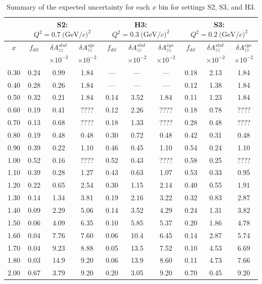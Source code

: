 \begin{table}
\begin{center}
\begin{tabular}{c|ccc|ccc|ccc}
 ~ & \multicolumn{3}{|c}{S2: $Q^2=0.7\mathrm{~(GeV/}c)^2$} & \multicolumn{3}{|c}{H3: $Q^2=0.3\mathrm{~(GeV/}c)^2$} & \multicolumn{3}{|c}{S3: $Q^2=0.2\mathrm{~(GeV/}c)^2$} \\
 \hline
  $x$  & $f_{dil}$ & $\delta A_{zz}^{stat}$ & $\delta A_{zz}^{sys}$ & $f_{dil}$ & $\delta A_{zz}^{stat}$ & $\delta A_{zz}^{sys}$ & $f_{dil}$ & $\delta A_{zz}^{stat}$ & $\delta A_{zz}^{sys}$ \\
  &     & $\times 10^{-2}$  & $\times 10^{-2}$  &    & $\times 10^{-2}$  & $\times 10^{-2}$ &    & $\times 10^{-2}$  & $\times 10^{-2}$ \\
\hline\hline
 0.30   &  0.24	 & 0.99	& 1.84	& ---	& ---	& ---	& 0.18	& 2.13	& 1.84 \\
 0.40   &  0.28	 & 0.26	& 1.84	& ---	& ---	& ---	& 0.12	& 1.38	& 1.84 \\
 0.50   &  0.32	 & 0.21	& 1.84	& 0.14	& 3.52	& 1.84	& 0.11	& 1.23	& 1.84 \\
 0.60   &  0.19	 & 0.41	& ????	& 0.12	& 2.26	& ????	& 0.18	& 0.78	& ???? \\ 
 0.70   &  0.13	 & 0.68	& ????	& 0.18	& 1.33	& ????	& 0.28	& 0.48	& ???? \\
 0.80	&  0.19	 & 0.48	& 0.48	& 0.30	& 0.72	& 0.48	& 0.42	& 0.31	& 0.48 \\
 0.90	&  0.39	 & 0.22 	& 1.10 	& 0.46	& 0.45	& 1.10	& 0.54	& 0.24	& 1.10 \\
 1.00	&  0.52	 & 0.16	& ???? 	& 0.52	& 0.43	& ????	& 0.58	& 0.25	& ???? \\
 1.10	&  0.39	 & 0.28	& 1.27 	& 0.43	& 0.63	& 1.07	& 0.53	& 0.33	& 0.95 \\
 1.20	&  0.22	 & 0.65	& 2.54 	& 0.30	& 1.15	& 2.14	& 0.40	& 0.55	& 1.91 \\
 1.30	&  0.14	 & 1.34	& 3.81 	& 0.19	& 2.16	& 3.22	& 0.32	& 0.83	& 2.87 \\
 1.40	&  0.09	 & 2.29	& 5.06 	& 0.14	& 3.52	& 4.29	& 0.24	& 1.31	& 3.82 \\
 1.50	&  0.06	 & 4.09	& 6.35	& 0.10	& 5.85	& 5.37	& 0.20	& 1.86	& 4.78 \\
 1.60	&  0.04	 & 7.76	& 7.60 	& 0.06	& 10.4	& 6.45	& 0.14	& 2.87	& 5.74 \\
 1.70	&  0.04	 & 9.23	& 8.88 	& 0.05	& 13.5	& 7.52	& 0.10	& 4.53	& 6.69 \\
 1.80	&  0.03	 & 14.9	& 9.20 	& 0.06	& 13.9	& 8.60	& 0.11	& 4.73	& 7.66 \\
 2.00   &  0.67	 & 3.79	& 9.20	& 0.20	& 3.05	& 9.20	& 0.70	& 0.45	& 9.20 \\
\hline\hline
\end{tabular}
\caption{\label{RATES3}Summary of the expected uncertainty for each $x$ bin for settings S2, S3, and H3. }
\end{center}
\end{table}


